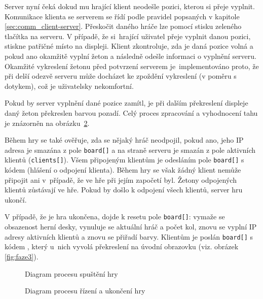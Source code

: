 Server nyní čeká dokud mu hrající klient neodešle pozici, kterou si přeje vyplnit. Komunikace klienta se serverem se řídí podle pravidel popsaných v kapitole \ref{sec:comm_client-server}. Přeskočit daného hráče lze pomocí stisku zeleného tlačítka na serveru. V případě, že si~hrající uživatel přeje vyplnit danou pozici, stiskne patřičné místo na displeji. Klient zkontroluje, zda je daná pozice volná a pokud ano okamžitě vyplní žeton a následně odešle informaci o vyplnění serveru. Okamžité vykreslení žetonu před potvrzení serverem je~implementováno proto, že při delší odezvě serveru může docházet ke zpoždění vykreslení (v poměru s dotykem), což je uživatelsky nekomfortní.

Pokud by server vyplnění dané pozice zamítl, je při dalším překreslení displeje daný žeton překreslen barvou pozadí. Celý proces zpracování a vyhodnocení tahu je znázorněn na obrázku~\ref{fig:flow:gameFlow}.

Během hry se také ověřuje, zda se nějaký hráč neodpojil, pokud ano, jeho IP adresa je smazána z pole \texttt{board[]} a na straně serveru je smazán z pole aktivních klientů (\texttt{clients[]}). Všem připojeným klientům je odesláním pole \texttt{board[]} s kódem  (hlášení o odpojení klienta). Během hry se však žádný klient nemůže připojit ani v~případě, že ve hře při jejím započetí byl. Žetony odpojených klientů zůstávají ve hře. Pokud by došlo k odpojení všech klientů, server hru ukončí.

V případě, že je hra ukončena, dojde k resetu pole \texttt{board[]}: vymaže se obsazenost herní desky, vynuluje se aktuální hráč a počet kol, znovu se vyplní IP adresy aktivních klientů a znovu se přiřadí barvy. Klientům je poslán \texttt{board[]} s kódem , který u~nich vyvolá překreslení na úvodní obrazovku (viz. obrázek \ref{fig:faze3}).

\begin{figure}
  \centering
  
  \caption{\label{fig:flow:gameBegin} Diagram procesu spuštění hry}
\end{figure}


\begin{figure}
  \centering
  
  \caption{\label{fig:flow:gameFlow} Diagram procesu řízení a ukončení hry}
\end{figure}


